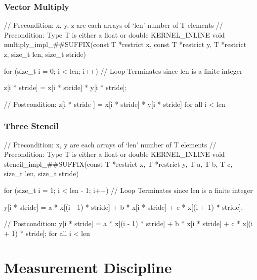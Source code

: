 \documentclass[11pt]{article}
\begin{document}
\subsubsection{Vector Multiply}

\begin{ccode}[caption={Vector Elementwise Multiplication kernel (C)}, label={lst:c-example}]
	// Precondition: x, y, z are each arrays of `len' number of T elements
	// Precondition: Type T is either a float or double
	KERNEL_INLINE void multiply_impl_##SUFFIX(const T *restrict x,
	const T *restrict y,
	T *restrict z, size_t len,
	size_t stride) {
			for (size_t i = 0; i < len; i++) // Loop Terminates since len is a finite integer

			z[i * stride] = x[i * stride] * y[i * stride];

		}
	// Postcondition: z[i * stride ] = x[i * stride] *  y[i * stride] for all i < len
\end{ccode}

\subsubsection{Three Stencil}

\begin{ccode}[caption={Three Element Stencil Kernel (C)}, label={lst:c-example}]
	// Precondition: x, y are each arrays of `len' number of T elements
	// Precondition: Type T is either a float or double
	KERNEL_INLINE void stencil_impl_##SUFFIX(const T *restrict x, T *restrict y,
	T a, T b, T c, size_t len,
	size_t stride) {
			for (size_t i = 1; i < len - 1; i++) // Loop Terminates since len is a finite integer

			y[i * stride] = a * x[(i - 1) * stride] + b * x[i * stride] + c * x[(i + 1) * stride];

		}

	// Postcondition: y[i * stride] = a * x[(i - 1) * stride] + b * x[i * stride] + c * x[(i + 1) * stride]; for all i < len
\end{ccode}

\section{Measurement Discipline}
\end{document}
